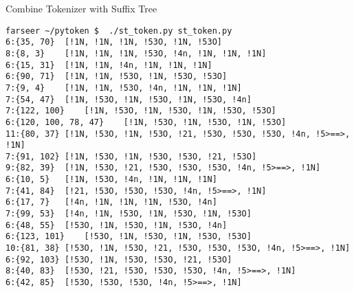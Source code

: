 \begin{frame}[fragile]{Combine Tokenizer with Suffix Tree}
\begin{lstlisting}
farseer ~/pytoken $  ./st_token.py st_token.py
6:{35, 70}	[!1N, !1N, !1N, !53O, !1N, !53O]
8:{8, 3}	[!1N, !1N, !1N, !53O, !4n, !1N, !1N, !1N]
6:{15, 31}	[!1N, !1N, !4n, !1N, !1N, !1N]
6:{90, 71}	[!1N, !1N, !53O, !1N, !53O, !53O]
7:{9, 4}	[!1N, !1N, !53O, !4n, !1N, !1N, !1N]
7:{54, 47}	[!1N, !53O, !1N, !53O, !1N, !53O, !4n]
7:{122, 100}	[!1N, !53O, !1N, !53O, !1N, !53O, !53O]
6:{120, 100, 78, 47}	[!1N, !53O, !1N, !53O, !1N, !53O]
11:{80, 37}	[!1N, !53O, !1N, !53O, !21, !53O, !53O, !53O, !4n, !5>==>, !1N]
7:{91, 102}	[!1N, !53O, !1N, !53O, !53O, !21, !53O]
9:{82, 39}	[!1N, !53O, !21, !53O, !53O, !53O, !4n, !5>==>, !1N]
6:{10, 5}	[!1N, !53O, !4n, !1N, !1N, !1N]
7:{41, 84}	[!21, !53O, !53O, !53O, !4n, !5>==>, !1N]
6:{17, 7}	[!4n, !1N, !1N, !1N, !53O, !4n]
7:{99, 53}	[!4n, !1N, !53O, !1N, !53O, !1N, !53O]
6:{48, 55}	[!53O, !1N, !53O, !1N, !53O, !4n]
6:{123, 101}	[!53O, !1N, !53O, !1N, !53O, !53O]
10:{81, 38}	[!53O, !1N, !53O, !21, !53O, !53O, !53O, !4n, !5>==>, !1N]
6:{92, 103}	[!53O, !1N, !53O, !53O, !21, !53O]
8:{40, 83}	[!53O, !21, !53O, !53O, !53O, !4n, !5>==>, !1N]
6:{42, 85}	[!53O, !53O, !53O, !4n, !5>==>, !1N]

\end{lstlisting}
\end{frame}

